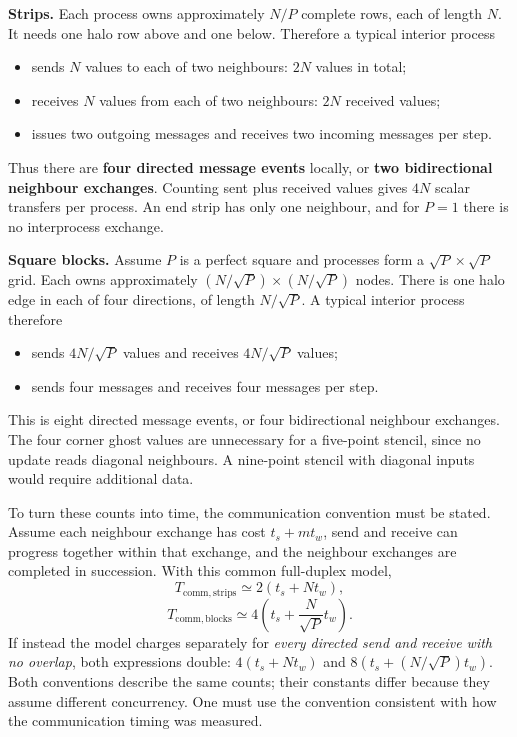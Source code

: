 \textbf{Strips.} Each process owns approximately $N/P$ complete rows, each of length $N$.
It needs one halo row above and one below. Therefore a typical interior process
\begin{itemize}
\item sends $N$ values to each of two neighbours: $2N$ values in total;
\item receives $N$ values from each of two neighbours: $2N$ received values;
\item issues two outgoing messages and receives two incoming messages per step.
\end{itemize}
Thus there are \textbf{four directed message events} locally, or \textbf{two bidirectional
neighbour exchanges}. Counting sent plus received values gives $4N$ scalar transfers per process.
An end strip has only one neighbour, and for $P=1$ there is no interprocess exchange.

\textbf{Square blocks.} Assume $P$ is a perfect square and processes form a
$\sqrt P\times\sqrt P$ grid. Each owns approximately
$(N/\sqrt P)\times(N/\sqrt P)$ nodes.
There is one halo edge in each of four directions, of length $N/\sqrt P$.
A typical interior process therefore
\begin{itemize}
\item sends $4N/\sqrt P$ values and receives $4N/\sqrt P$ values;
\item sends four messages and receives four messages per step.
\end{itemize}
This is eight directed message events, or four bidirectional neighbour exchanges.
The four corner ghost values are unnecessary for a five-point stencil, since no update reads
diagonal neighbours. A nine-point stencil with diagonal inputs would require additional data.

To turn these counts into time, the communication convention must be stated.
Assume each neighbour exchange has cost $t_s+m t_w$, send and receive can progress together
within that exchange, and the neighbour exchanges are completed in succession.
With this common full-duplex model,
\[
\boxed{T_{\mathrm{comm,strips}}\simeq2(t_s+Nt_w),}
\]
\[
\boxed{T_{\mathrm{comm,blocks}}\simeq4\left(t_s+\frac{N}{\sqrt P}t_w\right).}
\]
If instead the model charges separately for \emph{every directed send and receive with no
overlap}, both expressions double: $4(t_s+Nt_w)$ and
$8(t_s+(N/\sqrt P)t_w)$. Both conventions describe the same counts; their constants differ
because they assume different concurrency. One must use the convention consistent with how
the communication timing was measured.

